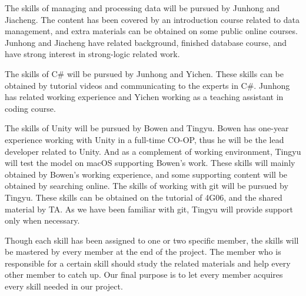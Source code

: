 \documentclass{article}
\begin{document}
The skills of managing and processing data will be pursued by Junhong and Jiacheng. The content has been covered by an introduction course related to data management, and extra materials can be obtained on some public online courses. Junhong and Jiacheng have related background, finished database course, and have strong interest in strong-logic related work. 

The skills of C\# will be pursued by Junhong and Yichen. These skills can be obtained by tutorial videos and communicating to the experts in C\#. Junhong has related working experience and Yichen working as a teaching assistant in coding course. 

The skills of Unity will be pursued by Bowen and Tingyu. Bowen has one-year experience working with Unity in a full-time CO-OP, thus he will be the lead developer related to Unity. And as a complement of working environment, Tingyu will test the model on macOS supporting Bowen's work. These skills will mainly obtained by Bowen's working experience, and some supporting content will be obtained by searching online. 
The skills of working with git will be pursued by Tingyu. These skills can be obtained on the tutorial of 4G06, and the shared material by TA. As we have been familiar with git, Tingyu will provide support only when necessary. 

Though each skill has been assigned to one or two specific member, the skills will be mastered by every member at the end of the project. The member who is responsible for a certain skill should study the related materials and help every other member to catch up. Our final purpose is to let every member acquires every skill needed in our project. 


\end{document}
